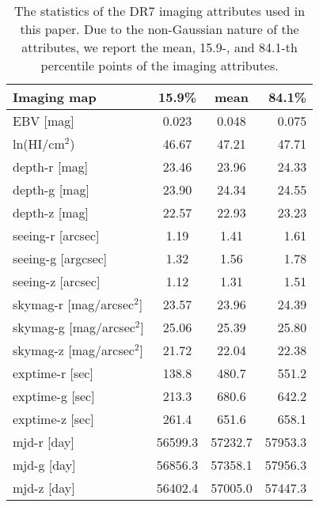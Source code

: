 \begin{table}
    \centering
    \caption{The statistics of the DR7 imaging attributes used in this paper. Due to the non-Gaussian nature of the attributes, we report the mean, 15.9-, and 84.1-th percentile points of the imaging attributes.}
    \label{tab:meanstats}
    \begin{tabular}{lccr} %
        \hline
        \hline
        \textbf{Imaging map} & 15.9\% &  mean & 84.1\% \\
\hline    
EBV [mag]                      &      0.023 &      0.048 &      0.075 \\ 
ln(HI/cm$^{2}$)                &      46.67 &      47.21 &      47.71 \\ 
\hline    
depth-r [mag]                  &      23.46 &      23.96 &      24.33 \\ 
depth-g [mag]                  &      23.90 &      24.34 &      24.55 \\ 
depth-z [mag]                  &      22.57 &      22.93 &      23.23 \\ 
\hline    
seeing-r [arcsec]              &       1.19 &       1.41 &       1.61 \\ 
seeing-g [argcsec]             &       1.32 &       1.56 &       1.78 \\ 
seeing-z [arcsec]              &       1.12 &       1.31 &       1.51 \\ 
\hline    
skymag-r [mag/arcsec$^{2}$]    &      23.57 &      23.96 &      24.39 \\ 
skymag-g [mag/arcsec$^{2}$]    &      25.06 &      25.39 &      25.80 \\ 
skymag-z [mag/arcsec$^{2}$]    &      21.72 &      22.04 &      22.38 \\ 
\hline    
exptime-r [sec]                &      138.8 &      480.7 &      551.2 \\ 
exptime-g [sec]                &      213.3 &      680.6 &      642.2 \\ 
exptime-z [sec]                &      261.4 &      651.6 &      658.1 \\ 
\hline    
mjd-r [day]                    &    56599.3 &    57232.7 &    57953.3 \\ 
mjd-g [day]                    &    56856.3 &    57358.1 &    57956.3 \\ 
mjd-z [day]                    &    56402.4 &    57005.0 &    57447.3 \\
    \end{tabular}
\end{table}